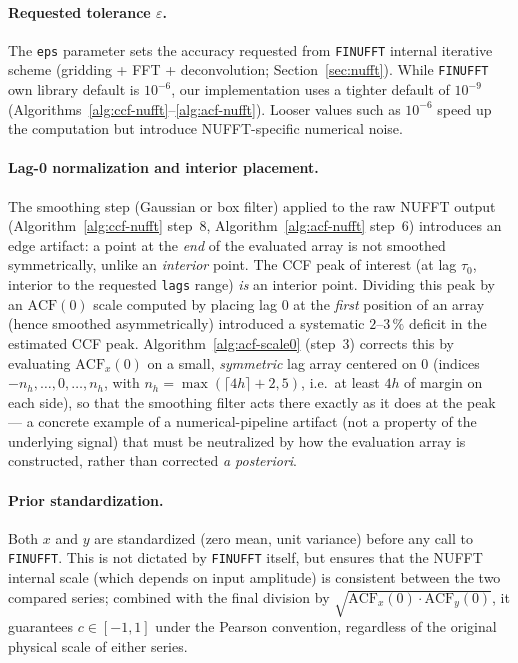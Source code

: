 \documentclass[twocolumn,10pt]{article}
\begin{document}
\paragraph{\bf Requested tolerance $\varepsilon$.}
%
The \texttt{eps} parameter sets the accuracy requested from
\texttt{FINUFFT} internal iterative scheme (gridding + FFT +
deconvolution; Section~\ref{sec:nufft}). While \texttt{FINUFFT} own
library default is $10^{-6}$, our implementation uses a tighter default
of $10^{-9}$ (Algorithms~\ref{alg:ccf-nufft}--\ref{alg:acf-nufft}).
Looser values such as $10^{-6}$ speed up the computation but introduce
NUFFT-specific numerical noise.
%
\paragraph{\bf Lag-0 normalization and interior placement.}
%
The smoothing step (Gaussian or box filter) applied to the raw NUFFT
output (Algorithm~\ref{alg:ccf-nufft} step~8, Algorithm~\ref{alg:acf-nufft} step~6) 
introduces an edge artifact: a point at the \emph{end} of the
evaluated array is not smoothed symmetrically, unlike an
\emph{interior} point. The CCF peak of interest (at lag $\tau_0$,
interior to the requested \texttt{lags} range) \emph{is} an interior
point. Dividing this peak by an $\mathrm{ACF}(0)$ scale computed by
placing lag $0$ at the \emph{first} position of an array (hence
smoothed asymmetrically) introduced a systematic $2$--$3\,\%$ deficit
in the estimated CCF peak. Algorithm~\ref{alg:acf-scale0} (step~3) corrects this
by evaluating $\mathrm{ACF}_x(0)$ on a small, \emph{symmetric} lag
array centered on $0$ (indices $-n_h,\dots,0,\dots,n_h$, with
$n_h=\max(\lceil 4h\rceil+2,5)$, i.e.\ at least $4h$ of margin on each
side), so that the smoothing filter acts there exactly as it does at
the peak --- a concrete example of a numerical-pipeline artifact (not a
property of the underlying signal) that must be neutralized by how the
evaluation array is constructed, rather than corrected \textit{a
posteriori}.
%
\paragraph{\bf Prior standardization.}
%
Both $x$ and $y$ are standardized (zero mean, unit variance) before any
call to \texttt{FINUFFT}. This is not dictated by \texttt{FINUFFT}
itself, but ensures that the NUFFT internal scale (which depends on
input amplitude) is consistent between the two compared series;
combined with the final division by
$\sqrt{\mathrm{ACF}_x(0)\cdot\mathrm{ACF}_y(0)}$, it guarantees
$c\in[-1,1]$ under the Pearson convention, regardless of the original
physical scale of either series.
%
\end{document}
